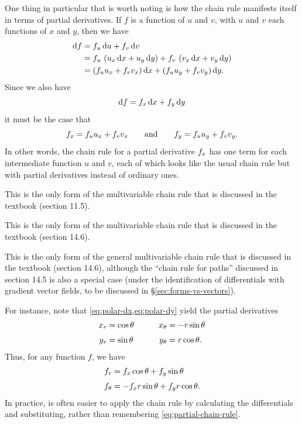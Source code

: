 \documentclass[12pt]{amsart}
\begin{document}
One thing in particular that is worth noting is how the chain rule manifests itself in terms of partial derivatives.
If $f$ is a function of $u$ and $v$, with $u$ and $v$ each functions of $x$ and $y$, then we have
\begin{align*}
  {\ensuremath{\mathrm{d} f}} &= {f}_{u}\,{\mathrm{d} u} + {f}_{v}\,{\mathrm{d} v}\\
  &= {f}_{u}\,\left({u}_{x}\,{\mathrm{d} x} + {u}_{y}\,{\mathrm{d} y}\right) + {f}_{v}\,\left({v}_{x}\,{\mathrm{d} x} + {v}_{y}\,{\mathrm{d} y}\right)\\
  &= \left({f}_{u}{u}_{x}+ {f}_{v}{v}_{x}\right){\mathrm{d} x} + \left({f}_{u}{u}_{y}+ {f}_{v}{v}_{y}\right){\mathrm{d} y}.
\end{align*}
Since we also have
\[ {\mathrm{d} f} = {f}_{x}\,{\mathrm{d} x} + {f}_{y}\,{\mathrm{d} y} \]
it must be the case that
\begin{equation}\label{eq:partial-chain-rule}
  {f}_{x} = {f}_{u}{u}_{x}+ {f}_{v}{v}_{x}
  \qquad\text{and}\qquad
  {f}_{y} = {f}_{u}{u}_{y}+ {f}_{v}{v}_{y}.
\end{equation}
In other words, the chain rule for a partial derivative ${f}_{x}$ has one term for each intermediate function $u$ and $v$, each of which looks like the usual chain rule but with partial derivatives instead of ordinary ones.
\begin{stewart}This is the only form of the multivariable chain rule that is discussed in the textbook (section 11.5).\end{stewart}%
\begin{hugheshallett}This is the only form of the multivariable chain rule that is discussed in the textbook (section 14.6).\end{hugheshallett}%
\begin{rogawski}This is the only form of the general multivariable chain rule that is discussed in the textbook (section 14.6), although the ``chain rule for paths'' discussed in section 14.5 is also a special case (under the identification of differentials with gradient vector fields, to be discussed in \S\ref{sec:forms-vs-vectors}).\end{rogawski}%

For instance, note that \cref{eq:polar-dx,eq:polar-dy} yield the partial derivatives
\begin{alignat*}{2}
  {x}_{r} &= \cos\theta &\qquad
  {x}_{\theta} &= -r\sin\theta\\[3pt]
  {y}_{r} &= \sin\theta &\quad
  {y}_{\theta} &= r\cos\theta.
\end{alignat*}
Thus, for any function $f$, we have
\begin{align*}
  \pder{f}{r} %
  &= \pder{f}{x} \cos\theta + \pder{f}{y} \sin\theta\\[3pt]
  \pder{f}{\theta} %
  &= -\pder{f}{x} r\sin\theta + \pder{f}{y} r \cos \theta.
\end{align*}
In practice, is often easier to apply the chain rule by calculating the differentials and substituting, rather than remembering \cref{eq:partial-chain-rule}.
\end{document}
